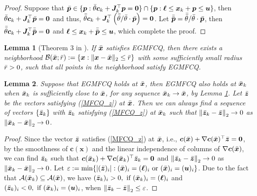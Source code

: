 \documentclass[aos]{imsart}
\numberwithin{equation}{section}
\theoremstyle{plain}
\newtheorem{lemma}{Lemma}
\begin{document}
\begin{appendix}
\begin{proof}
    Suppose that $\Bar{\bm{p}} \in \{\bm{p}: \Bar{\theta} \bm{c}_k +  \bm{J}_k^{\top} \bm{p} = \bm{0}\} \cap \{\bm{p}: \bm{\ell} \leq \bm{x}_k + \bm{p} \leq \bm{u}\}$, then $\Bar{\theta} \bm{c}_k +  \bm{J}_k^{\top} \Bar{\bm{p}}  = \bm{0}$ and thus, $\Bar{\Bar{\theta}} \bm{c}_k +  \bm{J}_k^{\top} \left(\Bar{\Bar{\theta}} /\Bar{\theta} \cdot \Bar{\bm{p}}\right)  = \bm{0}$. Let $\Bar{\Bar{\bm{p}}} = \Bar{\Bar{\theta}} /\Bar{\theta} \cdot \Bar{\bm{p}}$, then $\Bar{\Bar{\theta}} \bm{c}_k +  \bm{J}_k^{\top} \Bar{\Bar{\bm{p}}}  = \bm{0}$ and $\bm{\ell} \leq \bm{x}_k + \Bar{\Bar{\bm{p}}} \leq \bm{u}$, which complete the proof.
\end{proof}


\begin{lemma}
[Theorem 3 in \cite{robinson1976stability}]
\label{prop_MFCQ_neighborhood}
    If $\Bar{\bm{x}}$ satisfies EGMFCQ, then there exists a neighborhood $\mathcal{B}(\Bar{\bm{x}};\Bar{r}):= \{\bm{x}: \|\bm{x}- \Bar{\bm{x}}\|_2 \leq \Bar{r}\}$ with some sufficiently small radius $\Bar{r}>0$, such that all points in the neighborhood satisfy EGMFCQ. 
\end{lemma}


\begin{lemma}
\label{prop_continuity_z}
    Suppose that EGMFCQ holds at $\Bar{\bm{x}}$, then EGMFCQ also holds at $\Bar{\bm{x}}_{k}$ when $\Bar{\bm{x}}_{k}$ is sufficiently close to $\Bar{\bm{x}}$, for any sequence $\Bar{\bm{x}}_{k} \to \Bar{\bm{x}}$, by Lemma \ref{prop_MFCQ_neighborhood}. Let $\Bar{\bm{z}}$ be the vectors satisfying (\ref{MFCQ_z}) at $\Bar{\bm{x}}$. Then we can always find a sequence of vectors $\{\Bar{\bm{z}}_{k}\}$ with $\Bar{\bm{z}}_{k}$ satisfying (\ref{MFCQ_z}) at $\Bar{\bm{x}}_{k}$ such that
    $\left\| \Bar{\bm{z}}_{k} - \Bar{\bm{z}} \right\|_2 \to 0$ as $\left\| \Bar{\bm{x}}_{k} - \Bar{\bm{x}} \right\|_2 \to 0$. 
\end{lemma}


\begin{proof}
    Since the vector $\Bar{\bm{z}}$ satisfies (\ref{MFCQ_z}) at $\Bar{\bm{x}}$, i.e., $\bm{c}(\Bar{\bm{x}}) + \nabla \bm{c}(\Bar{\bm{x}})^{\top} \Bar{\bm{z}} = \bm{0}$, by the smoothness of $\bm{c}(\bm{x})$ and the linear independence of columns of $\nabla \bm{c}(\Bar{\bm{x}})$, we can find $\Bar{\bm{z}}_{k}$ such that $\bm{c}(\Bar{\bm{x}}_{k}) + \nabla \bm{c}(\Bar{\bm{x}}_{k})^{\top} \Bar{\bm{z}}_{k} = \bm{0}$ and  $\left\| \Bar{\bm{z}}_{k} - \Bar{\bm{z}}  \right\|_2 \to 0$ as $\left\| \Bar{\bm{x}}_{k}  - \Bar{\bm{x}}  \right\|_2 \to 0$. Let $\varepsilon := \min \{|(\Bar{\bm{z}})_i|: (\Bar{\bm{x}})_{i} = (\bm{\ell})_i~\text{or}~(\Bar{\bm{x}})_{i} = (\bm{u})_i\}$. Due to the fact that $\mathcal{A}(\Bar{\bm{x}}_{k}) \subseteq \mathcal{A}(\Bar{\bm{x}})$, we have $(\Bar{\bm{z}}_{k})_i >0,~\text{if}~(\Bar{\bm{x}}_{k})_{i} = (\bm{\ell})_i$ and $(\Bar{\bm{z}}_{k})_i < 0,~\text{if}~(\Bar{\bm{x}}_{k})_{i} = (\bm{u})_i$, when $\left\| \Bar{\bm{z}}_{k} - \Bar{\bm{z}} \right\|_2 \leq \varepsilon$. 
    

\end{proof}
\end{appendix}
\end{document}
